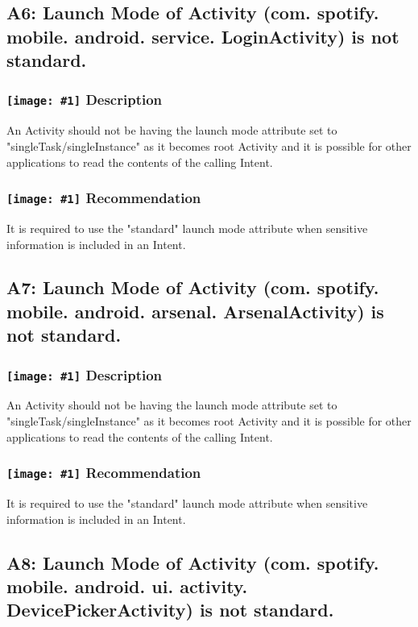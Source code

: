 \documentclass[12p]{article}
\newcommand{\icon}[1]{\texttt{[image: \#1]}}
\begin{document}
\subsection{A6: Launch Mode of Activity (com. spotify. mobile. android. service. LoginActivity) is not standard.}
\subsubsection*{\protect\icon{/home/miki/Documents/GITHUB/AndroidPermissions/python/vulns/report_icons/basic_sheet.png} Description}
An Activity should not be having the launch mode attribute set to "singleTask/singleInstance" as it becomes root Activity and it is possible for other applications to read the contents of the calling Intent.
\subsubsection*{\protect\icon{/home/miki/Documents/GITHUB/AndroidPermissions/python/vulns/report_icons/basic_todo.png} Recommendation}
It is required to use the "standard" launch mode attribute when sensitive information is included in an Intent.
\subsection{A7: Launch Mode of Activity (com. spotify. mobile. android. arsenal. ArsenalActivity) is not standard.}
\subsubsection*{\protect\icon{/home/miki/Documents/GITHUB/AndroidPermissions/python/vulns/report_icons/basic_sheet.png} Description}
An Activity should not be having the launch mode attribute set to "singleTask/singleInstance" as it becomes root Activity and it is possible for other applications to read the contents of the calling Intent.
\subsubsection*{\protect\icon{/home/miki/Documents/GITHUB/AndroidPermissions/python/vulns/report_icons/basic_todo.png} Recommendation}
It is required to use the "standard" launch mode attribute when sensitive information is included in an Intent.
\subsection{A8: Launch Mode of Activity (com. spotify. mobile. android. ui. activity. DevicePickerActivity) is not standard.}
\end{document}

